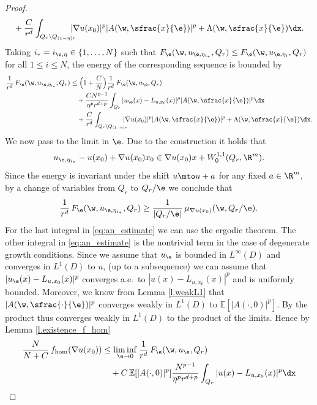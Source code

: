\begin{proof}
\begin{align*}
&\quad+\frac{C}{r^d}\int_{Q_r\setminus Q_{(1-\eta)r}}\hspace*{-3mm}|\nabla u(x_0)|^p|A(\w,\sfrac{x}{\e})|^p+\Lambda(\w,\sfrac{x}{\e})\dx.
\end{align*}
Taking $i_*=i_{\e,\eta}\in\{1,\ldots,N\}$ such that $F_{\e}(\w,u_{\e,\eta_{i_*}},Q_r)\leq F_{\e}(\w,u_{\e,\eta_i},Q_r)$ for all $1\leq i\leq N$, the energy of the corresponding sequence is bounded by
\begin{align}\label{eq:an_estimate}
\frac{1}{r^d}\,F_{\e}(\w,u_{\e,\eta_{i_*}},Q_r)&\leq \Bigl(1+\frac{C}{N}\Bigr)\frac{1}{r^d}\,F_{\e}(\w,u_{\e},Q_r)
\\
&\quad +\frac{CN^{p-1}}{\eta^p r^{d+p}}\int_{Q_r}|u_{\e}(x)-L_{u,x_0}(x)|^p|A(\w,\sfrac{x}{\e})|^p\dx\nonumber
\\
&\quad + \frac{C}{r^d}\int_{Q_r\setminus Q_{(1-\eta)r}}\hspace*{-3mm}|\nabla u(x_0)|^p|A(\w,\sfrac{x}{\e})|^p+\Lambda(\w,\sfrac{x}{\e})\dx. \nonumber
\end{align}
We now pass to the limit in $\e$. Due to the construction it holds that
\[
u_{\e,\eta_{i_*}}-u(x_0)+\nabla u(x_0)x_0\in \nabla u(x_0)x+W^{1,1}_0(Q_r,\R^m).
\]
Since the energy is invariant under the shift $u\mto u+a$ for any fixed $a\in\R^m$, by a change of variables from $Q_r$ to $Q_r/\e$ we conclude that
\begin{equation*}
\frac{1}{r^d}\,F_{\e}(\w,u_{\e,\eta_{i_*}},Q_r)\geq \frac{1}{|Q_r/\e|}\,\mu_{\nabla u(x_0)}(\w,Q_r/\e).
\end{equation*}
For the last integral in \eqref{eq:an_estimate} we can use the ergodic theorem. The other integral in \eqref{eq:an_estimate} is the nontrivial term in the case of degenerate growth conditions. Since we assume that $u_{\e}$ is bounded in $L^{\infty}(D)$ and converges in $L^1(D)$ to $u$, (up to a subsequence) we can assume that $|u_{\e}(x)-L_{u,x_0}(x)|^p$ converges a.e.\ to $|u(x)-L_{u,x_0}(x)|^p$ and is uniformly bounded. Moreover, we know from Lemma \ref{l.weakL1} that $|A(\w,\sfrac{\cdot}{\e})|^p$ converges weakly in $L^1(D)$ to $\mathbb{E}[|A(\cdot,0)|^p]$. By \cite[Prop.\,2.61]{FoLe} the product thus converges weakly in $L^1(D)$ to the product of the limits. Hence by Lemma \ref{l.existence_f_hom}
\begin{align*}
\frac{N}{N+C}\,f_{\hom}(\nabla u(x_0))&\leq \liminf_{\e\to 0}\frac{1}{r^d}\,F_{\e}(\w,u_{\e},Q_r)\nonumber
\\
&\quad +C\,\mathbb{E}[|A(\cdot,0)|^p]\frac{N^{p-1}}{\eta^p r^{d+p}}\int_{Q_r}|u(x)-L_{u,x_0}(x)|^p\dx

\end{align*}
\end{proof}
